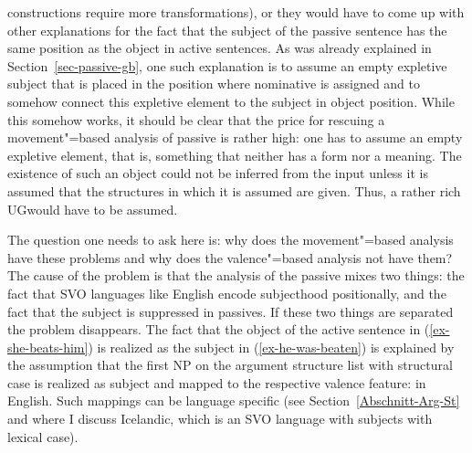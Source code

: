 constructions require more transformations), or they would have to come up with other
explanations for the fact that the subject of the passive sentence has the same position as the
object in active sentences. As was already explained in Section~\ref{sec-passive-gb}, one such explanation is to
assume an empty expletive subject that is placed in the position where nominative is assigned and
to somehow connect this expletive element to the subject in object position. While this somehow
works, it should be clear that the price for rescuing a movement"=based analysis of passive is rather
high: one has to assume an empty expletive element, that is, something that neither has a form nor a
meaning. The existence of such an object could not be inferred from the input unless it is assumed
that the structures in which it is assumed are given. Thus, a rather rich UG\indexug would have to be
assumed. 

The question one needs to ask here is: why does the movement"=based analysis have these problems and why
does the valence"=based analysis not have them? The cause of the problem is that the analysis
of the passive mixes two things: the fact that SVO languages like English encode subjecthood
positionally, and the fact that the subject is suppressed in passives. If these two things are
separated the problem disappears. The fact that the object of the active sentence in (\ref{ex-she-beats-him}) is
realized as the subject in (\ref{ex-he-was-beaten}) is explained by the assumption that the first NP on the
argument structure list with structural case is realized as subject and mapped to the respective valence feature: \spr in
English. Such mappings can be language specific (see Section~\ref{Abschnitt-Arg-St} and
 where I discuss Icelandic, which is an SVO language with
subjects with lexical case).

